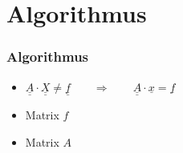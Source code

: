 \section{Algorithmus}

\newcommand{\dunderline}[1]{\underline{\underline{#1}}}
\begin{frame}
\frametitle{Algorithmus} 
	\begin{itemize}[<+->]
		\item $\dunderline{A}\cdot \dunderline{X} \ne \dunderline{f} \qquad\Rightarrow\qquad \dunderline{A}\cdot \underline{x} = \underline{f}$
		\item Matrix $f$
		\item Matrix $A$
	\end{itemize}

\end{frame}

